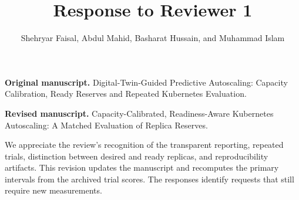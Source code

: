 \documentclass[10pt,a4paper]{article}
\title{Response to Reviewer 1}
\author{Shehryar Faisal, Abdul Mahid, Basharat Hussain, and Muhammad Islam}
\date{}
\begin{document}
\maketitle
\noindent\textbf{Original manuscript.} Digital-Twin-Guided Predictive Autoscaling: Capacity Calibration, Ready Reserves and Repeated Kubernetes Evaluation.

\noindent\textbf{Revised manuscript.} Capacity-Calibrated, Readiness-Aware Kubernetes Autoscaling: A Matched Evaluation of Replica Reserves.

We appreciate the review's recognition of the transparent reporting, repeated trials, distinction between desired and ready replicas, and reproducibility artifacts. This revision updates the manuscript and recomputes the primary intervals from the archived trial scores. The responses identify requests that still require new measurements.
\end{document}
